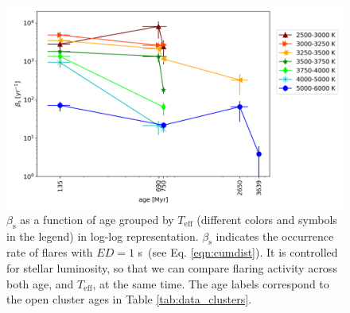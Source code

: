 \documentclass{aa}
\begin{document}
\begin{figure}[ht!]
    \centering
    \includegraphics[width=15.5cm]{pics/FFDs/beta_T_age_ED_wheatland.png}
    \caption{$\beta_\mathrm{s}$ as a function of age grouped by $T_\mathrm{eff}$ (different colors and symbols in the legend) in log-log representation. $\beta_\mathrm{s}$ indicates the occurrence rate of flares with $ED=1$ s~(see Eq. \ref{eqn:cumdist}). It is controlled for stellar luminosity, so that we can compare flaring activity across both age, and $T_\mathrm{eff}$, at the same time. The age labels correspond to the open cluster ages in Table \ref{tab:data_clusters}.}    	
    \label{fig:beta_T_age}
\end{figure}
\end{document}
